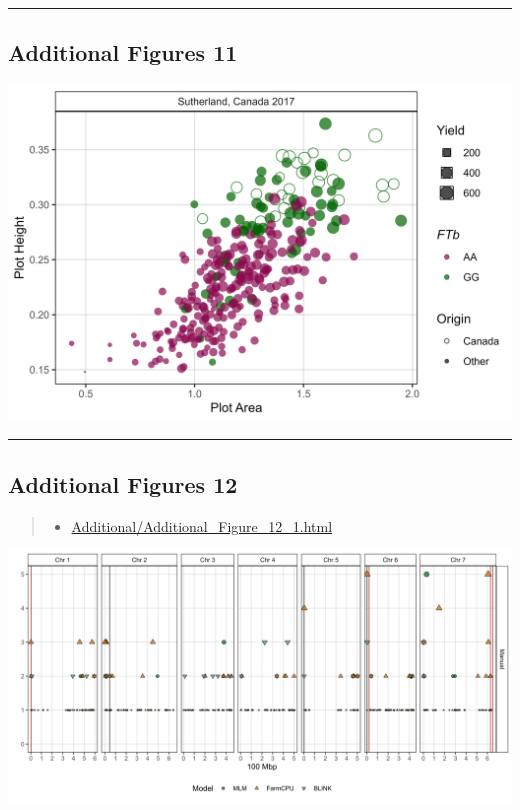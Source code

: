 \documentclass[
]{article}
\providecommand{\tightlist}{%
  \setlength{\itemsep}{0pt}\setlength{\parskip}{0pt}}
\begin{document}
\begin{center}\rule{0.5\linewidth}{0.5pt}\end{center}

\subsection{Additional Figures 11}\label{additional-figures-11}

\includegraphics{Additional/Additional_Figure_11.png}

\begin{center}\rule{0.5\linewidth}{0.5pt}\end{center}

\pagebreak

\subsection{Additional Figures 12}\label{additional-figures-12}

\begin{quote}
\begin{itemize}
\tightlist
\item
  \href{https://derekmichaelwright.github.io/AGILE_LDP_UAV/Additional/Additional_Figure_12_1.html}{Additional/Additional\_Figure\_12\_1.html}
\end{itemize}
\end{quote}

\includegraphics{Additional/Additional_Figure_12_1.png}
\end{document}
